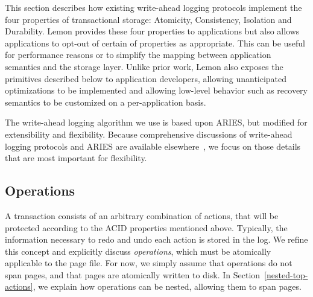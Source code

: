 \documentclass[letterpaper,twocolumn,english]{article}
\newcommand{\yad}{Lemon\xspace}
\begin{document}
This section describes how existing write-ahead logging protocols
implement the four properties of transactional storage: Atomicity,
Consistency, Isolation and Durability.  \yad provides these four
properties to applications but also allows applications to opt-out of
certain of properties as appropriate.  This can be useful for
performance reasons or to simplify the mapping between application
semantics and the storage layer.  Unlike prior work, \yad also exposes
the primitives described below to application developers, allowing
unanticipated optimizations to be implemented and allowing low-level
behavior such as recovery semantics to be customized on a
per-application basis.

The write-ahead logging algorithm we use is based upon ARIES, but
modified for extensibility and flexibility. Because comprehensive
discussions of write-ahead logging protocols and ARIES are available
elsewhere~\cite{haerder, aries}, we focus on those details that are
most important for flexibility.

%


\subsection{Operations\label{sub:OperationProperties}}

A transaction consists of an arbitrary combination of actions, that
will be protected according to the ACID properties mentioned above.
Typically, the
information necessary to redo and undo each action is stored in the
log.  We refine this concept and explicitly discuss {\em operations},
which must be atomically applicable to the page file.  For now, we
simply assume that operations do not span pages, and that pages are
atomically written to disk.  In Section~\ref{nested-top-actions}, we 
explain how operations can be nested, allowing them to span pages.
\end{document}
